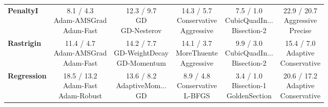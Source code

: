 \documentclass{article}
\begin{document}
\begin{longtable}{lccccc}
\textbf{PenaltyI} &  \makecell{8.1 / 4.3 \\ \scriptsize{Adam-AMSGrad} \\ \scriptsize{Adam-Fast}}&  \makecell{12.3 / 9.7 \\ \scriptsize{GD} \\ \scriptsize{GD-Nesterov}}&  \makecell{14.3 / 5.7 \\ \scriptsize{Conservative} \\ \scriptsize{Aggressive}}& \cellcolor{green!20} \makecell{7.5 / 1.0 \\ \scriptsize{CubicQuadIn...} \\ \scriptsize{Bisection-2}}& \cellcolor{red!15} \makecell{22.9 / 20.7 \\ \scriptsize{Aggressive} \\ \scriptsize{Precise}} \\
\textbf{Rastrigin} &  \makecell{11.4 / 4.7 \\ \scriptsize{Adam-AMSGrad} \\ \scriptsize{Adam-Fast}}&  \makecell{14.2 / 7.7 \\ \scriptsize{GD-WeightDecay} \\ \scriptsize{GD-Momentum}}&  \makecell{14.1 / 3.7 \\ \scriptsize{MoreThuente} \\ \scriptsize{Aggressive}}& \cellcolor{green!20} \makecell{9.9 / 3.0 \\ \scriptsize{CubicQuadIn...} \\ \scriptsize{Bisection-2}}& \cellcolor{red!15} \makecell{15.4 / 7.0 \\ \scriptsize{Adaptive} \\ \scriptsize{Conservative}} \\
\textbf{Regression} &  \makecell{18.5 / 13.2 \\ \scriptsize{Adam-Fast} \\ \scriptsize{Adam-Robust}}&  \makecell{13.6 / 8.2 \\ \scriptsize{AdaptiveMom...} \\ \scriptsize{GD}}&  \makecell{8.9 / 4.8 \\ \scriptsize{Conservative} \\ \scriptsize{L-BFGS}}& \cellcolor{green!20} \makecell{3.4 / 1.0 \\ \scriptsize{Bisection-1} \\ \scriptsize{GoldenSection}}& \cellcolor{red!15} \makecell{20.6 / 17.2 \\ \scriptsize{Adaptive} \\ \scriptsize{Conservative}} \\

\end{longtable}
\end{document}
